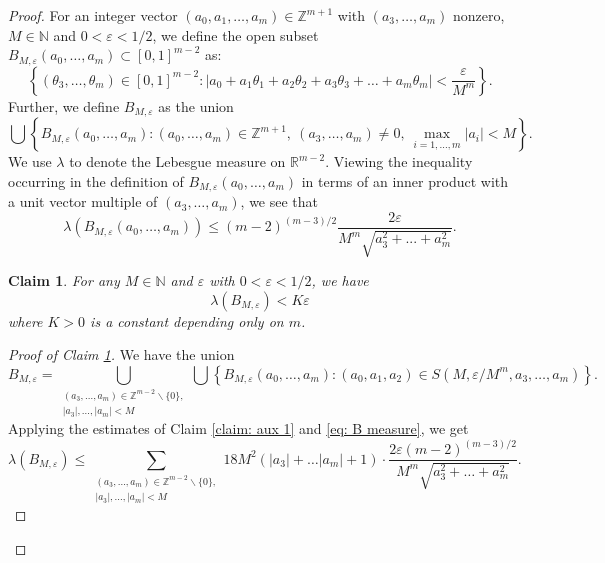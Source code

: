 \documentclass[reqno,11pt, twoside]{amsart}
\theoremstyle{plain}
\newtheorem{claim}{Claim}[thm]
\theoremstyle{definition}
\theoremstyle{definition}
\theoremstyle{remark}
\numberwithin{equation}{section}
\newcommand{\R}{{\mathbb{R}}}
\newcommand{\Z}{{\mathbb{Z}}}
\newcommand{\N}{{\mathbb{N}}}
\begin{document}
\begin{proof}
For an integer vector $(a_0, a_1, \dots, a_m) \in \Z^{m+1}$ with $(a_3,\dots, a_m)$ nonzero, $M \in \N$ and $ 0<\varepsilon < 1/2$, we define the open subset $B_{M, \varepsilon}(a_0, \dots, a_m) \subset [0,1]^{m-2}$ as:
\begin{equation*}
    \left\lbrace (\theta_3, \dots , \theta_m) \in [0,1]^{m-2}: |a_0 + a_1 \theta_1 + a_2 \theta_2 + a_3\theta_3 + \dots + a_m \theta_m| < \frac{\varepsilon}{M^m}\right\rbrace.
\end{equation*}
Further, we define $B_{M,\varepsilon}$ as the union
\begin{equation*}
     \bigcup \left\lbrace B_{M, \varepsilon}(a_0, \dots, a_m) : (a_0, \dots, a_m) \in \Z^{m+1},\ (a_3, \dots, a_m) \neq 0,\ \max_{i=1,\dots,m} |a_i| < M\right\rbrace.
\end{equation*}
We use $\lambda$ to  denote the Lebesgue measure on $\R^{m-2}$. 
Viewing the inequality occurring in the definition of $B_{M, \varepsilon}(a_0, \dots, a_m)$ in terms of an inner product with a unit vector multiple of $(a_3, \dots, a_m)$, we see that 
\begin{equation}\label{eq: B measure}
\lambda(B_{M, \varepsilon}(a_0, \dots, a_m)) \leq (m-2)^{(m-3)/2}\frac{2 \varepsilon}{M^m \sqrt{a_3^2+...+a_m^2}}.
  \end{equation}
  \begin{claim}\label{claim: BMe measure}
      For any $M \in \N$ and $\varepsilon$ with $0 < \varepsilon < 1/2$, we have
      \begin{equation*}
          \lambda(B_{M, \varepsilon}) < K \varepsilon
      \end{equation*}
      where $K>0$ is a constant depending only on $m$.
  \end{claim}
  \begin{proof}[Proof of Claim \ref{claim: BMe measure}]
      We have the union
      \begin{equation*}
          B_{M, \varepsilon} = \bigcup_{\substack{(a_3,\dots, a_m) \in \Z^{m-2} \smallsetminus \{0\},\\ |a_3| ,\dots, |a_m| < M}} \bigcup \left\lbrace B_{M, \varepsilon}(a_0,\dots, a_m): (a_0,a_1,a_2) \in S(M, \varepsilon/M^m, a_3,\dots, a_m) \right\rbrace.
      \end{equation*}
      Applying the estimates of Claim \ref{claim: aux 1} and \eqref{eq: B measure}, we get
      \begin{equation*}
          \lambda(B_{M, \varepsilon}) \leq \sum_{\substack{(a_3,\dots, a_m) \in \Z^{m-2} \smallsetminus \{0\},\\ |a_3| ,\dots, |a_m| < M}} 18M^2 (|a_3| + \dots |a_m| + 1) \cdot \frac{2\varepsilon(m-2)^{(m-3)/2} }{M^m \sqrt{a_3^2 + \dots + a_m^2}}.

\end{equation*}
\end{proof}
\end{proof}
\end{document}

